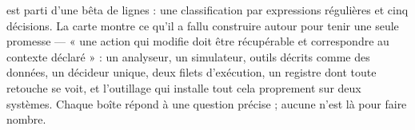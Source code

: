 \begin{pourquoi}
\demo{} est parti d'une bêta de \betalignessrc{} lignes : une classification par expressions
régulières et cinq décisions. La carte montre ce qu'il a fallu construire autour pour tenir
une seule promesse --- « une action qui modifie doit être récupérable et correspondre au
contexte déclaré » : un analyseur, un simulateur, \nboutils{} outils décrits comme des données,
un décideur unique, deux filets d'exécution, un registre dont toute retouche se voit, et l'outillage qui
installe tout cela proprement sur deux systèmes. Chaque boîte répond à une question précise ;
aucune n'est là pour faire nombre.
\end{pourquoi}
